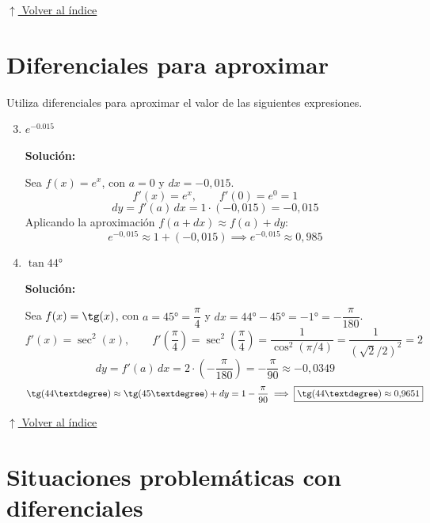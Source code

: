 \documentclass[12pt]{article}
\newcommand{\solucion}{%
    \vspace{0.8em}%
    \textbf{Solución:}%
}
\newcommand{\volverindice}{%
    \vspace{1em}%
    \begin{flushright}%
        \hyperlink{indice}{\small $\uparrow$ Volver al índice}%
    \end{flushright}%
}
\begin{document}
\volverindice

\section{Diferenciales para aproximar}

Utiliza diferenciales para aproximar el valor de las siguientes expresiones.

\begin{enumerate}[label=\alph*.-]
    \setcounter{enumi}{2} %
    \item $e^{-0.015}$

    \solucion

    Sea $f(x) = e^x$, con $a = 0$ y $dx = -0{,}015$.
    \[
    f'(x) = e^x, \qquad f'(0) = e^0 = 1
    \]
    \[
    dy = f'(a)\,dx = 1 \cdot (-0{,}015) = -0{,}015
    \]
    Aplicando la aproximación $f(a+dx) \approx f(a) + dy$:
    \[
    e^{-0{,}015} \approx 1 + (-0{,}015) \implies \boxed{e^{-0{,}015} \approx 0{,}985}
    \]

    \item $\tan 44°$

    \solucion

    Sea $f(x) = \tg(x)$, con $a = 45° = \dfrac{\pi}{4}$ y $dx = 44° - 45° = -1° = -\dfrac{\pi}{180}$.
    \[
    f'(x) = \sec^2(x), \qquad f'\!\left(\frac{\pi}{4}\right) = \sec^2\!\left(\frac{\pi}{4}\right) = \frac{1}{\cos^2(\pi/4)} = \frac{1}{(\sqrt{2}/2)^2} = 2
    \]
    \[
    dy = f'(a)\,dx = 2\cdot\left(-\frac{\pi}{180}\right) = -\frac{\pi}{90} \approx -0{,}0349
    \]
    \[
    \tg(44°) \approx \tg(45°) + dy = 1 - \frac{\pi}{90} \implies \boxed{\tg(44°) \approx 0{,}9651}
    \]

\end{enumerate}

\volverindice
\newpage

\section{Situaciones problemáticas con diferenciales}
\end{document}
